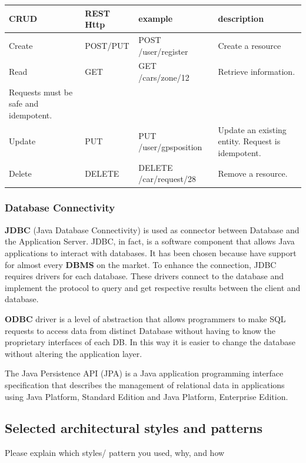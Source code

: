 \begin{center}
	\begin{adjustbox}{max width=\textwidth}	
		\begin{tabular}{|l|>{\raggedright}p{2.5cm}|>{\raggedright}p{4.5cm}|>{\raggedright}p{5cm}|}
			\hline 
			CRUD & REST Http & example &description\tabularnewline
			\hline 
			
			Create & POST/PUT & POST /user/register  & Create a resource \tabularnewline
			\hline 
			Read & GET & GET /cars/zone/12 & Retrieve information. \\  Requests must be safe and idempotent.\tabularnewline
			\hline 
			Update & PUT & PUT /user/gpsposition & Update an existing entity. Request is idempotent. \tabularnewline
			\hline 
			Delete & DELETE & DELETE /car/request/28 & Remove a resource.\tabularnewline
			\hline 
		\end{tabular}
	\end{adjustbox}	
	\par\end{center}

\subsubsection{Database Connectivity} \textbf{JDBC} (Java Database Connectivity) is used as connector between Database and the Application Server. JDBC, in fact, is a software component that allows Java applications to interact with databases. It has been chosen because have support for almost every \textbf{DBMS} on the market.
To enhance the connection, JDBC requires drivers for each database. These drivers connect to the database and implement the protocol to query and get respective results between the client and database. 


\textbf{ODBC} driver is a level of abstraction that allows programmers to make SQL requests to access data from distinct Database without having to know the proprietary interfaces of each DB. In this way it is easier to change the database without altering the application layer.


The Java Persistence API (JPA) is a Java application programming interface specification that describes the management of relational data in applications using Java Platform, Standard Edition and Java Platform, Enterprise Edition.



\subsection{Selected architectural styles and patterns}
Please explain which styles/ pattern you used, why, and how

